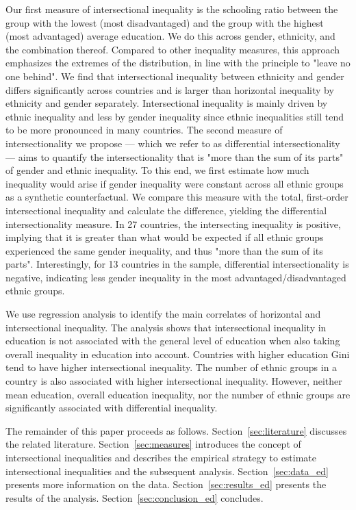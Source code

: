 Our first measure of intersectional inequality is the schooling ratio between the group with the lowest (most disadvantaged) and the group with the highest (most advantaged) average education. We do this across gender, ethnicity, and the combination thereof. Compared to other inequality measures, this approach emphasizes the extremes of the distribution, in line with the principle to "leave no one behind". We find that intersectional inequality between ethnicity and gender differs significantly across countries and is larger than horizontal inequality by ethnicity and gender separately. Intersectional inequality is mainly driven by ethnic inequality and less by gender inequality since ethnic inequalities still tend to be more pronounced in many countries. The second measure of intersectionality we propose --- which we refer to as differential intersectionality --- aims to quantify the intersectionality that is "more than the sum of its parts" of gender and ethnic inequality. To this end, we first estimate how much inequality would arise if gender inequality were constant across all ethnic groups as a synthetic counterfactual. We compare this measure with the total, first-order intersectional inequality and calculate the difference, yielding the differential intersectionality measure. In 27 countries, the intersecting inequality is positive, implying that it is greater than what would be expected if all ethnic groups experienced the same gender inequality, and thus "more than the sum of its parts". Interestingly, for 13 countries in the sample, differential intersectionality is negative, indicating less gender inequality in the most advantaged/disadvantaged ethnic groups. 

We use regression analysis to identify the main correlates of horizontal and intersectional inequality. The analysis shows that intersectional inequality in education is not associated with the general level of education when also taking overall inequality in education into account. Countries with higher education Gini tend to have higher intersectional inequality. The number of ethnic groups in a country is also associated with higher intersectional inequality. However, neither mean education, overall education inequality, nor the number of ethnic groups are significantly associated with differential inequality. 

The remainder of this paper proceeds as follows. Section~\ref{sec:literature} discusses the related literature. Section~\ref{sec:measures} introduces the concept of intersectional inequalities and describes the empirical strategy to estimate intersectional inequalities and the subsequent analysis. Section~\ref{sec:data_ed} presents more information on the data. Section~\ref{sec:results_ed} presents the results of the analysis. Section~\ref{sec:conclusion_ed} concludes.

